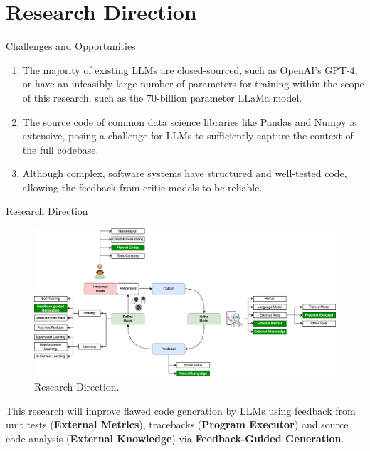 \section{Research Direction}

\begin{frame}{Challenges and Opportunities}
    \begin{enumerate}
        \item The majority of existing LLMs are closed-sourced, such as OpenAI's GPT-4, or have an infeasibly large number of parameters for training within the scope of this research, such as the 70-billion parameter LLaMa model.

        \item The source code of common data science libraries like Pandas and Numpy is extensive, posing a challenge for LLMs to sufficiently capture the context of the full codebase.

        \item Although complex, software systems have structured and well-tested code, allowing the feedback from critic models to be reliable.
    \end{enumerate}
\end{frame}

\begin{frame}{Research Direction}
    \begin{figure}[!htb]
        \centering
        \includegraphics[scale=0.045]{img/direction_of_research}
        \captionsetup{font=small}
        \caption{Research Direction.}
    \end{figure}
    This research will improve flawed code generation by LLMs using feedback from unit tests (\textbf{External Metrics}), tracebacks (\textbf{Program Executor}) and source code analysis (\textbf{External Knowledge}) via \textbf{Feedback-Guided Generation}.
\end{frame}
